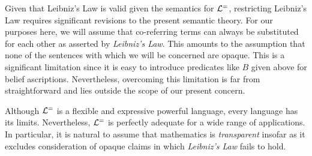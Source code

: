 Given that Leibniz's Law is valid given the semantics for $\mathcal{L}^{=}$, restricting Leibniz's Law requires significant revisions to the present semantic theory.
For our purposes here, we will assume that co-referring terms can always be substituted for each other as asserted by \textit{Leibniz's Law}.
This amounts to the assumption that none of the sentences with which we will be concerned are opaque.
This is a significant limitation since it is easy to introduce predicates like $B$ given above for belief ascriptions. 
Nevertheless, overcoming this limitation is far from straightforward and lies outside the scope of our present concern.

Although $\mathcal{L}^{=}$ is a flexible and expressive powerful language, every language has its limits.
Nevertheless, $\mathcal{L}^{=}$ is perfectly adequate for a wide range of applications. 
In particular, it is natural to assume that mathematics is \textit{transparent} insofar as it excludes consideration of opaque claims in which \textit{Leibniz's Law} fails to hold.









\iffalse

\practiceproblems

